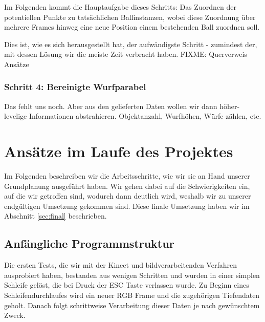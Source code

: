 \documentclass[12pt,a4paper,ngerman]{scrartcl}
\begin{document}
Im Folgenden kommt die Hauptaufgabe dieses Schritts: Das Zuordnen der potentiellen
Punkte zu tatsächlichen Ballinstanzen, wobei diese Zuordnung über mehrere Frames
hinweg eine neue Position einem bestehenden Ball zuordnen soll.

Dies ist, wie es sich herausgestellt hat, der aufwändigste Schritt - zumindest der, mit dessen Lösung wir die meiste Zeit verbracht haben. {\color{red} FIXME: Querverweis Ansätze}





\subsubsection{Schritt 4: Bereinigte Wurfparabel}

Das fehlt uns noch. Aber aus den gelieferten Daten wollen wir dann höher-levelige Informationen abstrahieren. Objektanzahl, Wurfhöhen, Würfe zählen, etc.




\section{Ansätze im Laufe des Projektes}
\label{sec:ansaetze}

Im Folgenden beschreiben wir die Arbeitsschritte, wie wir sie an Hand unserer
Grundplanung ausgeführt haben. Wir gehen dabei auf die Schwierigkeiten ein, auf die
wir getroffen sind, wodurch dann deutlich wird, weshalb wir zu unserer endgültigen
Umsetzung gekommen sind. Diese finale Umsetzung haben wir im Abschnitt \ref{sec:final} beschrieben.

\subsection{Anfängliche Programmstruktur}

Die ersten Tests, die wir mit der Kinect und bildverarbeitenden Verfahren
ausprobiert haben, bestanden aus wenigen Schritten und wurden in einer
simplen Schleife gelöst, die bei Druck der ESC Taste verlassen wurde. Zu Beginn
eines Schleifendurchlaufes wird ein neuer RGB Frame und die zugehörigen
Tiefendaten geholt. Danach folgt schrittweise Verarbeitung dieser Daten je nach
gewünschtem Zweck.
\end{document}
